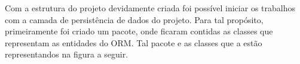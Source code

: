 	\par Com a estrutura do projeto devidamente criada foi possível iniciar os
trabalhos com a camada de persistência de dados do projeto. Para tal propósito,
primeiramente foi criado um pacote, onde ficaram contidas as classes que
representam as entidades do ORM. Tal pacote e as classes que a estão
representandos na figura a seguir.
